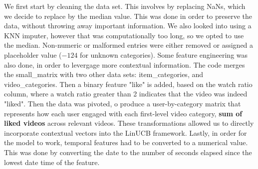 We first start by cleaning the data set. This involves by replacing NaNs, which we decide to replace by the median value. This was done in order to preserve the data, without throwing away important information. We also looked into using a KNN imputer, however that was computationally too long, so we opted to use the median. Non-numeric or malformed entries were either removed or assigned a placeholder value (\(-124\) for unknown categories). Some feature engineering was also done, in order to levergage more contextual information. The code merges the small\_matrix with two other data sets: item\_categories, and video\_categories. Then a binary feature "like" is added, based on the watch ratio column, where a watch ratio greater than 2 indicates that the video was indeed "liked". Then the data was pivoted, o produce a user-by-category matrix that represents how each user engaged with each first-level video category, \textbf{sum of liked videos} across relevant videos. These transformations allowed us to directly incorporate contextual vectors into the LinUCB framework. Lastly, in order for the model to work, temporal features had to be converted to a numerical value. This was done by converting the date to the number of seconds elapsed since the lowest date time of the feature.
